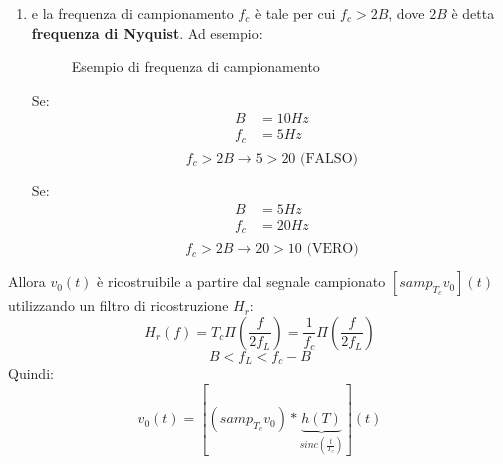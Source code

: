 \documentclass[a4paper]{article}
\begin{document}
\begin{theorem}
\begin{enumerate}
    \item e la frequenza di campionamento \( f_c \) è tale per cui \( f_c > 2B \),
      dove \( 2B \) è detta \textbf{frequenza di Nyquist}. Ad esempio:
      \begin{figure}[H]
        \centering
        \caption{Esempio di frequenza di campionamento}
      \end{figure}
      Se:
      \[
      \begin{aligned}
        B &= 10 Hz\\
        f_c &= 5 Hz \\
      \end{aligned}
      \] 
      \[
        f_c > 2B \to 5 > 20 \text{ (FALSO)}
      \] 

      \vspace{1em}
      \noindent
      Se:
      \[
      \begin{aligned}
        B &= 5 Hz \\
        f_c &= 20 Hz \\
      \end{aligned}
      \] 
      \[
        f_c > 2B \to 20 > 10 \text{ (VERO)}
      \] 
  \end{enumerate}
  Allora \( v_0(t) \) è ricostruibile a partire dal segnale campionato 
  \( \left[ samp_{T_c} v_0\right](t) \) utilizzando un filtro di ricostruzione \( H_r \):
  \[
  H_r(f) = T_c \Pi \left( \frac{f}{2f_L} \right) = \frac{1}{f_c} \Pi \left( \frac{f}{2f_L} \right) 
  \] 
  \[
  B < f_L < f_c - B
  \] 
  Quindi:
  \[
    v_0(t) = \left[ (samp_{T_c} v_0) \ast \underbrace{h(T)}_{sinc \left( \frac{t}{T_c} \right) } \right](t)
  \] 
  

\end{theorem}
\end{document}
